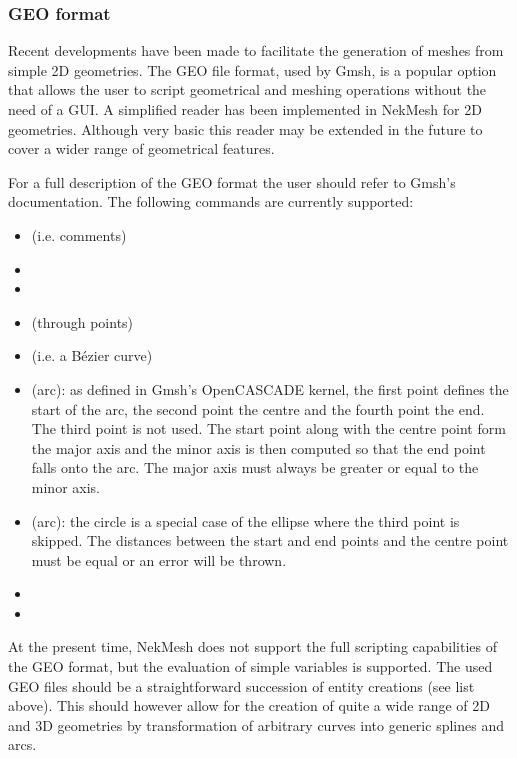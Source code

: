 \subsubsection{GEO format}

Recent developments have been made to facilitate the generation of meshes from
simple 2D geometries. The GEO file format, used by Gmsh, is a popular option
that allows the user to script geometrical and meshing operations without the
need of a GUI. A simplified reader has been implemented in NekMesh for 2D geometries.
Although very basic this reader may be extended in the future to cover a wider
range of geometrical features.

For a full description of the GEO format the user should refer to Gmsh's
documentation. The following commands are currently supported:
\begin{itemize}
  \item \inltt{//} (i.e. comments)
  \item {}
  \item {}
  \item {} (through points)
  \item {} (i.e. a B\'{e}zier curve)
  \item {} (arc): as defined in Gmsh's OpenCASCADE kernel, the first
    point defines the start of the arc, the second point the centre and the fourth
    point the end. The third point is not used. The start point along with the centre
    point form the major axis and the minor axis is then computed so that the end
    point falls onto the arc. The major axis must always be greater or equal to the
    minor axis.
  \item {} (arc): the circle is a special case of the ellipse where the
    third point is skipped. The distances between the start and end points and the
    centre point must be equal or an error will be thrown.
  \item {}
  \item {}
\end{itemize}

At the present time, NekMesh does not support the full scripting capabilities of
the GEO format, but the evaluation of simple variables is supported. The used
GEO files should be a straightforward succession of entity creations (see list
above). This should however allow for the creation of quite a wide range of 2D
and 3D geometries by transformation of arbitrary curves into generic splines and
arcs.
